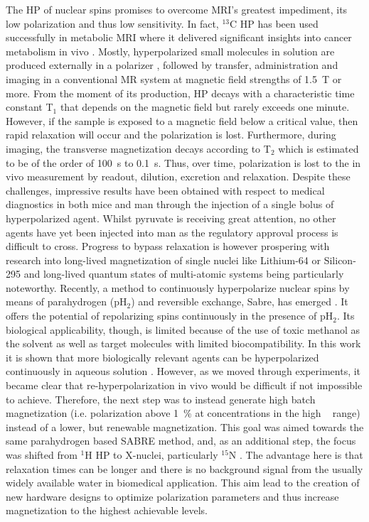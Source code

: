     The HP of nuclear spins promises to overcome MRI's greatest impediment, its low polarization and thus low sensitivity. In fact, $^{13}$C HP has been used successfully in metabolic MRI where it delivered significant insights into cancer metabolism in vivo \cite{golman_cardiac_2008}. Mostly, hyperpolarized small molecules in solution are produced externally in a polarizer \cite{ardenkjaer-larsen_present_2016}, followed by transfer, administration and imaging in a conventional MR system at magnetic field strengths of \SI{1.5}{\tesla} or more. From the moment of its production, HP decays with a characteristic time constant T$_1$ that depends on the magnetic field but rarely exceeds one minute. However, if the sample is exposed to a magnetic field below a critical value, then rapid relaxation will occur and the polarization is lost. Furthermore, during imaging, the transverse magnetization decays according to T$_2$ which is estimated to be of the order of \SI{100}{\second} to  \SI{0.1}{\second}. Thus, over time, polarization is lost to the in vivo measurement by readout, dilution, excretion and relaxation. Despite these challenges, impressive results have been obtained with respect to medical diagnostics in both mice and man through the injection of a single bolus of hyperpolarized agent. Whilst pyruvate is receiving great attention, no other agents have yet been injected into man as the regulatory approval process is difficult to cross. Progress to bypass relaxation is however prospering with research into long-lived magnetization of single nuclei like Lithium-64 \cite{van_heeswijk_hyperpolarized_2009} or Silicon-295 \cite{kwiatkowski_nanometer_2017} and long-lived quantum states of multi-atomic systems \cite{pileio_storage_2010, noauthor_y._nodate} being particularly noteworthy. Recently, a method to continuously hyperpolarize  nuclear spins by means of parahydrogen (pH$_2$) and reversible exchange, Sabre, has emerged \cite{adams_reversible_2009-2, hovener_continuous_2014-1}. It offers the potential of repolarizing spins continuously in the presence of pH$_2$. Its biological applicability, though, is limited because of the use of toxic methanol as the solvent as well as target molecules with limited biocompatibility. In this work it is shown that more biologically relevant agents can be hyperpolarized continuously in aqueous solution \cite{truong_irreversible_2014-1}. However, as we moved through experiments, it became clear that re-hyperpolarization in vivo would be difficult if not impossible to achieve. Therefore, the next step was to instead generate high batch magnetization (i.e. polarization above \SI{1}{\percent} at concentrations in the high \si{\milli\molar} range) instead of a lower, but renewable magnetization. This goal was aimed towards the same parahydrogen based SABRE method, and, as an additional step, the focus was shifted from $^1$H HP to X-nuclei, particularly $^{15}$N \cite{truong_15n_2015-1}. The advantage here is that relaxation times can be longer and there is no background signal from the usually widely available water in biomedical application. This aim lead to the creation of new hardware designs to optimize polarization parameters and thus increase magnetization to the highest achievable levels.
